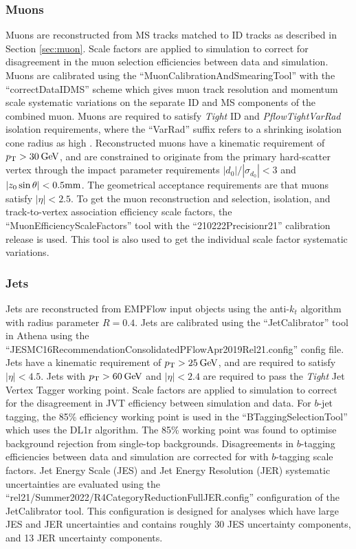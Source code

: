 \subsubsection{Muons}

Muons are reconstructed from MS tracks matched to ID tracks as described in Section \ref{sec:muon}. Scale factors are applied to simulation to correct for disagreement in the muon selection efficiencies between data and simulation. Muons are calibrated using the ``MuonCalibrationAndSmearingTool'' with the ``correctData\tu IDMS'' scheme which gives muon track resolution and momentum scale systematic variations on the separate ID and MS components of the combined muon. Muons are required to satisfy \textit{Tight} ID and \textit{PflowTight\tu VarRad} isolation requirements, where the ``VarRad'' suffix refers to a shrinking isolation cone radius as high \pt. Reconstructed muons have a kinematic requirement of $p_{\text{T}}>30\hspace{2pt}\text{Ge\kern -0.1em V}$, and are constrained to originate from the primary hard-scatter vertex through the impact parameter requirements $|d_0|/|\sigma_{d_0}|<3$ and $|z_0\sin\theta|<0.5\text{mm}$. The geometrical acceptance requirements are that muons satisfy $|\eta|<2.5$. To get the muon reconstruction and selection, isolation, and track-to-vertex association efficiency scale factors, the ``MuonEfficiencyScaleFactors'' tool with the ``210222\tu Precision\tu r21'' calibration release is used. This tool is also used to get the individual scale factor systematic variations.

\subsubsection{Jets}

Jets are reconstructed from EMPFlow input objects using the anti-$k_t$ algorithm with radius parameter $R=0.4$. Jets are calibrated using the ``JetCalibrator'' tool in Athena using the ``JES\tu MC16Recommendation\tu Consolidated\tu PFlow\tu Apr2019\tu Rel21.conﬁg'' config file. Jets have a kinematic requirement of $p_{\text{T}}>25\hspace{2pt}\text{Ge\kern -0.1em V}$, and are required to satisfy $|\eta|<4.5$. Jets with $p_{\text{T}}>60\hspace{2pt}\text{Ge\kern -0.1em V}$ and $|\eta|<2.4$ are required to pass the \textit{Tight} Jet Vertex Tagger \cite{Insitu:JVT} working point. Scale factors are applied to simulation to correct for the disagreement in JVT efficiency between simulation and data. For $b$-jet tagging, the 85\% efficiency working point is used in the ``BTaggingSelectionTool'' which uses the DL1r \cite{Atlas:btagging} algorithm. The 85\% working point was found to optimise background rejection from single-top backgrounds. Disagreements in $b$-tagging efficiencies between data and simulation are corrected for with $b$-tagging scale factors. Jet Energy Scale (JES) and Jet Energy Resolution (JER) systematic uncertainties are evaluated using the ``rel21/Summer2022/R4\tu CategoryReduction\tu FullJER.config'' configuration of the JetCalibrator tool. This configuration is designed for analyses which have large JES and JER uncertainties and contains roughly 30 JES uncertainty components, and 13 JER uncertainty components. 


